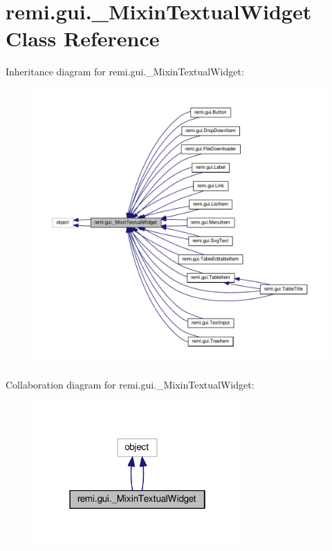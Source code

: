 \hypertarget{classremi_1_1gui_1_1__MixinTextualWidget}{}\section{remi.\+gui.\+\_\+\+Mixin\+Textual\+Widget Class Reference}
\label{classremi_1_1gui_1_1__MixinTextualWidget}


Inheritance diagram for remi.\+gui.\+\_\+\+Mixin\+Textual\+Widget\+:
\nopagebreak
\begin{figure}[H]
\begin{center}
\leavevmode
\includegraphics[width=350pt]{d1/d84/classremi_1_1gui_1_1__MixinTextualWidget__inherit__graph}
\end{center}
\end{figure}


Collaboration diagram for remi.\+gui.\+\_\+\+Mixin\+Textual\+Widget\+:
\nopagebreak
\begin{figure}[H]
\begin{center}
\leavevmode
\includegraphics[width=226pt]{d8/dac/classremi_1_1gui_1_1__MixinTextualWidget__coll__graph}
\end{center}
\end{figure}
